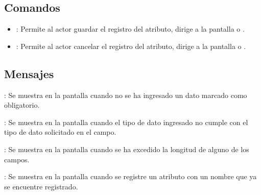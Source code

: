 \subsection{Comandos}
\begin{itemize}
	\item {}: Permite al actor guardar el registro del atributo, dirige a la pantalla  o .
	\item {}: Permite al actor cancelar el registro del atributo, dirige a la pantalla  o .
\end{itemize}

\subsection{Mensajes}

\begin{Citemize}
	\item {}: Se muestra en la pantalla  cuando no se ha ingresado un dato marcado como obligatorio.
	\item {}: Se muestra en la pantalla  cuando el tipo de dato ingresado no cumple con el tipo de dato solicitado en el campo.
	\item {}: Se muestra en la pantalla  cuando se ha excedido la longitud de alguno de los campos.
	\item {}: Se muestra en la pantalla  cuando se registre un atributo con un nombre que ya se encuentre registrado.
\end{Citemize}

